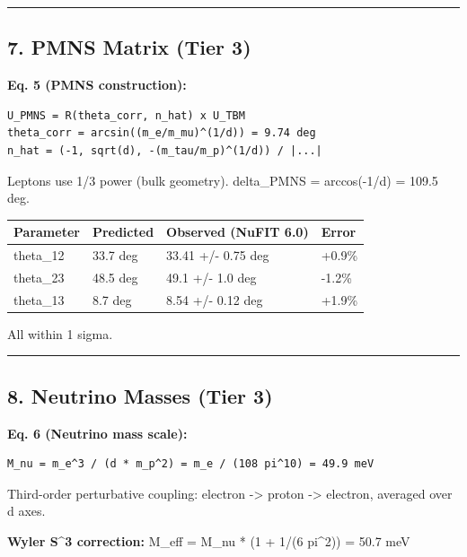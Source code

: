\documentclass[
]{article}
\newcounter{none} %
\begin{document}
\begin{center}\rule{0.5\linewidth}{0.5pt}\end{center}

\subsection{7. PMNS Matrix (Tier 3)}\label{pmns-matrix-tier-3}

\textbf{Eq. 5 (PMNS construction):}

\begin{verbatim}
U_PMNS = R(theta_corr, n_hat) x U_TBM
theta_corr = arcsin((m_e/m_mu)^(1/d)) = 9.74 deg
n_hat = (-1, sqrt(d), -(m_tau/m_p)^(1/d)) / |...|
\end{verbatim}

Leptons use 1/3 power (bulk geometry). delta\_PMNS = arccos(-1/d) =
109.5 deg.

{\def\LTcaptype{none} %
\begin{longtable}[]{@{}llll@{}}
\toprule\noalign{}
Parameter & Predicted & Observed (NuFIT 6.0) & Error \\
\midrule\noalign{}
\endhead
\bottomrule\noalign{}
\endlastfoot
theta\_12 & 33.7 deg & 33.41 +/- 0.75 deg & +0.9\% \\
theta\_23 & 48.5 deg & 49.1 +/- 1.0 deg & -1.2\% \\
theta\_13 & 8.7 deg & 8.54 +/- 0.12 deg & +1.9\% \\
\end{longtable}
}

All within 1 sigma.

\begin{center}\rule{0.5\linewidth}{0.5pt}\end{center}

\subsection{8. Neutrino Masses (Tier 3)}\label{neutrino-masses-tier-3}

\textbf{Eq. 6 (Neutrino mass scale):}

\begin{verbatim}
M_nu = m_e^3 / (d * m_p^2) = m_e / (108 pi^10) = 49.9 meV
\end{verbatim}

Third-order perturbative coupling: electron -\textgreater{} proton
-\textgreater{} electron, averaged over d axes.

\textbf{Wyler S\^{}3 correction:} M\_eff = M\_nu * (1 + 1/(6 pi\^{}2)) =
50.7 meV
\end{document}
